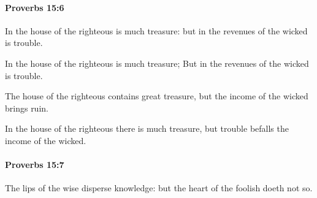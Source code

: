		\paragraph{Proverbs 15:6} %
			\label{PROVERBS-15-6}

			In the house of the righteous is much treasure: but in the revenues of the wicked is trouble.

			\begin{versebox}
					\item[BHS] 
					\item[ASV] In the house of the righteous is much treasure; But in the revenues of the wicked is trouble.
					\item[NIV] The house of the righteous contains great treasure, but the income of the wicked brings ruin.
					\item[NRSV] In the house of the righteous there is much treasure, but trouble befalls the income of the wicked.
			\end{versebox}

		\paragraph{Proverbs 15:7} %
			\label{PROVERBS-15-7}

			The lips of the wise disperse knowledge: but the heart of the foolish doeth not so.


